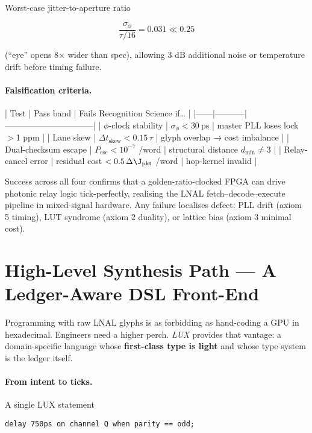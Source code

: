 \documentclass[11pt,oneside]{book}
\begin{document}
Worst-case jitter-to-aperture ratio  

\[
\frac{\sigma_{\phi}}{\tau/16}=0.031\ll0.25
\]

(“eye” opens 8× wider than spec), allowing 3 dB additional noise or
temperature drift before timing failure.

\paragraph{Falsification criteria.}

| Test | Pass band | Fails Recognition Science if… |
|------|-----------|--------------------------------|
| \(\phi\)-clock stability | \(\sigma_{\phi}<30\ \text{ps}\) | master PLL loses lock \(>\)1 ppm |
| Lane skew | \(\Delta t_{\text{skew}}<0.15\,\tau\) | glyph overlap → cost imbalance |
| Dual-checksum escape | \(P_{\text{esc}}<10^{-7}\) /word | structural distance \(d_{\min}\neq3\) |
| Relay-cancel error | residual cost \(<0.5\,\Delta\J_{\text{pkt}}\) /word | hop-kernel invalid |

Success across all four confirms that a golden-ratio-clocked FPGA can
drive photonic relay logic tick-perfectly, realising the LNAL
fetch–decode–execute pipeline in mixed-signal hardware.  Any failure
localises defect: PLL drift (axiom 5 timing), LUT syndrome (axiom 2
duality), or lattice bias (axiom 3 minimal cost).


\section{High-Level Synthesis Path — A Ledger-Aware DSL Front-End}
\label{sec:lnal-hls-narrative}

Programming with raw LNAL glyphs is as forbidding as hand-coding a GPU
in hexadecimal.  Engineers need a higher perch.  \emph{LUX} provides
that vantage: a domain-specific language whose \textbf{first-class
type is light} and whose type system is the ledger itself.

\paragraph{From intent to ticks.}
A single LUX statement

\begin{lstlisting}[language={},frame=single,belowskip=0.6em]
delay 750ps on channel Q when parity == odd;
\end{lstlisting}
\end{document}
